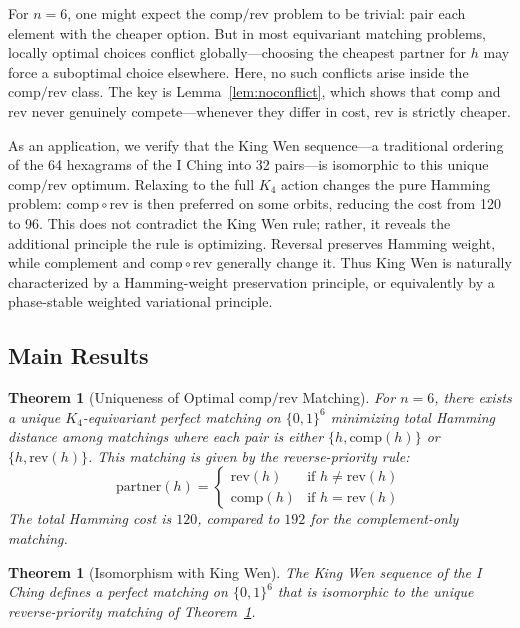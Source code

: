 \documentclass[11pt]{article}
\theoremstyle{definition}
\theoremstyle{plain}
\newtheorem{theorem}[definition]{Theorem}
\newcommand{\B}{\{0,1\}}
\newcommand{\comp}{\mathrm{comp}}
\newcommand{\rev}{\mathrm{rev}}
\begin{document}
For $n = 6$, one might expect the $\comp/\rev$ problem to be trivial: pair each element with the cheaper option. But in most equivariant matching problems, locally optimal choices conflict globally---choosing the cheapest partner for $h$ may force a suboptimal choice elsewhere. Here, no such conflicts arise inside the $\comp/\rev$ class. The key is Lemma~\ref{lem:noconflict}, which shows that $\comp$ and $\rev$ never genuinely compete---whenever they differ in cost, $\rev$ is strictly cheaper.

As an application, we verify that the King Wen sequence---a traditional ordering of the 64 hexagrams of the I Ching into 32 pairs---is isomorphic to this unique $\comp/\rev$ optimum. Relaxing to the full $K_4$ action changes the pure Hamming problem: $\comp \circ \rev$ is then preferred on some orbits, reducing the cost from 120 to 96. This does not contradict the King Wen rule; rather, it reveals the additional principle the rule is optimizing. Reversal preserves Hamming weight, while complement and $\comp \circ \rev$ generally change it. Thus King Wen is naturally characterized by a Hamming-weight preservation principle, or equivalently by a phase-stable weighted variational principle.

\subsection{Main Results}

\begin{theorem}[Uniqueness of Optimal $\comp/\rev$ Matching]\label{thm:main}
For $n = 6$, there exists a unique $K_4$-equivariant perfect matching on $\B^6$ minimizing total Hamming distance among matchings where each pair is either $\{h, \comp(h)\}$ or $\{h, \rev(h)\}$. This matching is given by the \emph{reverse-priority rule}:
\[
\mathrm{partner}(h) =
\begin{cases}
\rev(h) & \text{if } h \neq \rev(h) \\
\comp(h) & \text{if } h = \rev(h)
\end{cases}
\]
The total Hamming cost is $120$, compared to $192$ for the complement-only matching.
\end{theorem}

\begin{theorem}[Isomorphism with King Wen]\label{thm:iching}
The King Wen sequence of the I Ching defines a perfect matching on $\B^6$ that is isomorphic to the unique reverse-priority matching of Theorem~\ref{thm:main}.
\end{theorem}
\end{document}

